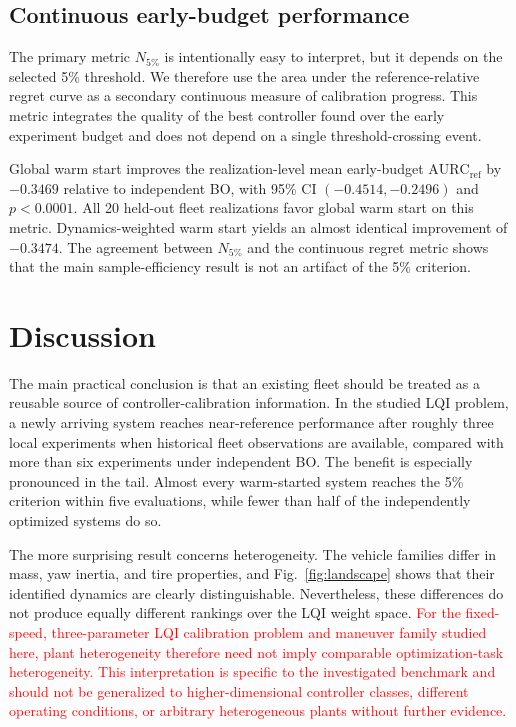 \documentclass[conference]{IEEEtran}
\newcommand{\rev}[1]{\textcolor{red}{#1}}
\newcommand{\AURCref}{\mathrm{AURC}_{\mathrm{ref}}}
\newcommand{\Nfive}{N_{5\%}}
\begin{document}
\subsection{Continuous early-budget performance}
The primary metric $\Nfive$ is intentionally easy to interpret, but it depends on the selected 5\% threshold. We therefore use the area under the reference-relative regret curve as a secondary continuous measure of calibration progress. This metric integrates the quality of the best controller found over the early experiment budget and does not depend on a single threshold-crossing event.

Global warm start improves the realization-level mean early-budget $\AURCref$ by $-0.3469$ relative to independent BO, with 95\% CI $(-0.4514,-0.2496)$ and $p<0.0001$. All 20 held-out fleet realizations favor global warm start on this metric. Dynamics-weighted warm start yields an almost identical improvement of $-0.3474$. The agreement between $\Nfive$ and the continuous regret metric shows that the main sample-efficiency result is not an artifact of the 5\% criterion.

\section{Discussion}
The main practical conclusion is that an existing fleet should be treated as a reusable source of controller-calibration information. In the studied LQI problem, a newly arriving system reaches near-reference performance after roughly three local experiments when historical fleet observations are available, compared with more than six experiments under independent BO. The benefit is especially pronounced in the tail. Almost every warm-started system reaches the 5\% criterion within five evaluations, while fewer than half of the independently optimized systems do so.

The more surprising result concerns heterogeneity. The vehicle families differ in mass, yaw inertia, and tire properties, and Fig.~\ref{fig:landscape} shows that their identified dynamics are clearly distinguishable. Nevertheless, these differences do not produce equally different rankings over the LQI weight space. \rev{For the fixed-speed, three-parameter LQI calibration problem and maneuver family studied here, plant heterogeneity therefore need not imply comparable optimization-task heterogeneity. This interpretation is specific to the investigated benchmark and should not be generalized to higher-dimensional controller classes, different operating conditions, or arbitrary heterogeneous plants without further evidence.}
\end{document}
